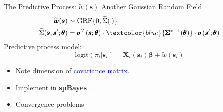 \documentclass{beamer}
\begin{document}
% 

\begin{frame}[fragile]{The Predictive Process: $\widetilde{w}(\pmb{s})$}
Another Gaussian Random Field
\begin{align*}
\widetilde{\pmb{w}}(\pmb{s}) &\sim \text{GRF}\{0, \widetilde{\Sigma}(\cdot)\} \\
\widetilde{\Sigma}(\pmb{s}, \pmb{s}'; \pmb{\theta}) &= \pmb{\sigma}^{T}(\pmb{s};\pmb{\theta}) \cdot \textcolor{blue}{\pmb{\Sigma}^{*-1}(\pmb{\theta})} \cdot \pmb{\sigma}(\pmb{s}';\pmb{\theta})
\end{align*}
Predictive process model:
    \begin{equation}
    \text{logit}(\pi_{i}|\pmb{s}_{i}) = \pmb{X}_{i}(\pmb{s}_{i}) \pmb{\beta} + \widetilde{w}(\pmb{s}_{i}) \nonumber
    \end{equation}
    \begin{itemize}
    \item Note dimension of \textcolor{blue}{covariance matrix}.
    \item Implement in {\bf spBayes} \citep{Finley2013}.
    \item Convergence problems
    \end{itemize}
\end{frame}
\end{document}
